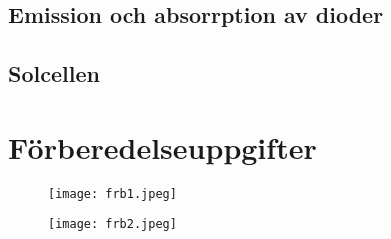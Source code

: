 \documentclass[a4paper]{article}
\begin{document}
\subsection{Emission och absorrption av dioder}

\subsection{Solcellen}


\newpage
\section{Förberedelseuppgifter}
\begin{figure}[H]
\centering
\texttt{[image: frb1.jpeg]}
\end{figure}
\newpage
\begin{figure}[H]
\centering
\texttt{[image: frb2.jpeg]}
\end{figure}
\end{document}
